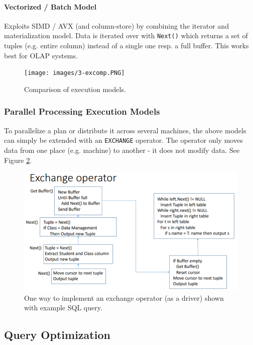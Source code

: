\paragraph{Vectorized / Batch Model}
Exploits SIMD / AVX (and column-store) by combining the iterator and materialization model. Data is iterated over with \texttt{Next()} which returns a set of tuples (e.g. entire column) instead of a single one resp. a full buffer. This works best for OLAP systems. %

\begin{figure}[h]
	\centering
	\texttt{[image: images/3-excomp.PNG]}
	\caption{Comparison of execution models.}
	\label{fig:excomp}
\end{figure}



\subsubsection{Parallel Processing Execution Models}

To parallelize a plan or distribute it across several machines, the above models can simply be extended with an \texttt{EXCHANGE} operator. The operator only moves data from one place (e.g. machine) to another - it does not modify data. See Figure \ref{fig:exchange}.

\begin{figure}[h]
	\centering
	\includegraphics[scale=0.7]{images/3-exchange.PNG}
	\caption{One way to implement an exchange operator (as a driver) shown with example SQL query.}
	\label{fig:exchange}
\end{figure}


\subsection{Query Optimization}

